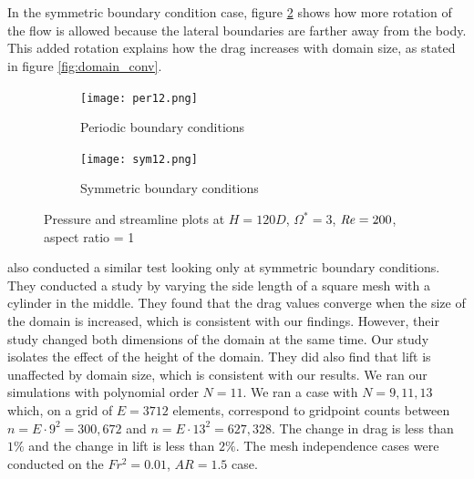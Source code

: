 \\\\In the symmetric boundary condition case, figure \ref{fig:sym12} shows how more rotation of the flow is allowed because the lateral boundaries are farther away from the body. This added rotation explains how the drag increases with domain size, as stated in figure \ref{fig:domain_conv}.  
\begin{figure}
    \centering
    \begin{subfigure}{0.49\textwidth}
    \texttt{[image: per12.png]}
    \caption{Periodic boundary conditions}
    \label{fig:per12}
    \end{subfigure}
    \begin{subfigure}{0.49\textwidth}
    \texttt{[image: sym12.png]}
    \caption{Symmetric boundary conditions}
    \label{fig:sym12}
    \end{subfigure}
    \caption{Pressure and streamline plots at $H=120D$, $\Omega^{\ast} = 3$, $\mathit{Re} = 200$, aspect ratio = 1}
    \label{fig:per sym12}
\end{figure}
\cite{mittal_flow_2003} also conducted a similar test looking only at symmetric boundary conditions. They conducted a study by varying the side length of a square mesh with a cylinder in the middle. They found that the drag values converge when the size of the domain is increased, which is consistent with our findings. However, their study changed both dimensions of the domain at the same time. Our study isolates the effect of the height of the domain. They did also find that lift is unaffected by domain size, which is consistent with our results. We ran our simulations with polynomial order $N = 11$. We ran a case with $N = 9, 11, 13$ which, on a grid of $E = 3712$ elements, correspond to gridpoint counts between $n = E \cdot 9^2 = 300,672$ and $n = E \cdot 13^2 = 627,328$. The change in drag is less than $1\%$ and the change in lift is less than $2\%$. The mesh independence cases were conducted on the $Fr^2 = 0.01$, $AR = 1.5$ case.

\clearpage
